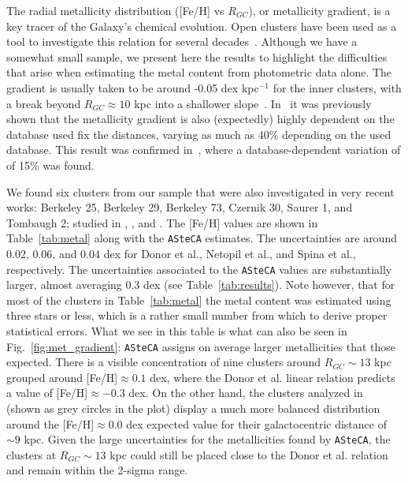 \documentclass[referee]{aa}
\begin{document}
  The radial metallicity distribution ([Fe/H] vs $R_{GC}$), or metallicity
  gradient, is a key tracer of the Galaxy's chemical evolution. Open clusters
  have been used as a tool to investigate this relation for several
  decades~\citep{Janes_1979}.
  Although we have a somewhat small sample, we present here the results to
  highlight the difficulties that arise when estimating the metal content from
  photometric data alone.
  The gradient is usually taken to be around -0.05 dex kpc$^{-1}$ for the inner
  clusters, with a break beyond $R_{GC}\approx10$ kpc into a shallower
  slope~\citep{Donor_2020}. In~\cite{Donor_2018} it was previously shown that
  the metallicity gradient is also (expectedly) highly dependent on the database
  used fix the distances, varying as much as 40\% depending on the used
  database. This result was confirmed in~\cite{Donor_2020}, where a
  database-dependent variation of of 15\% was found.

  We found six clusters from our sample that were also investigated in very
  recent works: Berkeley 25, Berkeley 29, Berkeley 73, Czernik 30, Saurer 1, and
  Tombaugh 2; studied in \cite{Donor_2020}, \cite{Netopil_2021}, and
  \cite{Spina_2021}. The [Fe/H] values are shown in Table~\ref{tab:metal} along
  with the \texttt{ASteCA} estimates. The uncertainties are around 0.02, 0.06,
  and 0.04 dex for Donor et al., Netopil et al., and Spina et al., respectively.
  The uncertainties associated to the \texttt{ASteCA} values are substantially
  larger, almost averaging 0.3 dex (see Table~\ref{tab:results}). Note however,
  that for most of the clusters in Table~\ref{tab:metal} the metal content was
  estimated using three stars or less, which is a rather small number from which
  to derive proper statistical errors. What we see in this table is what can
  also be seen in Fig.~\ref{fig:met_gradient}: \texttt{ASteCA} assigns on
  average larger metallicities that those expected.
  There is a visible concentration
  of nine clusters around $R_{GC}\sim13$ kpc grouped around
  [Fe/H]$\approx0.1$ dex, where the Donor et al. linear relation
  predicts a value of [Fe/H]$\approx-0.3$ dex. On the other hand, the clusters
  analyzed in~\cite{Perren_2020} (shown as grey circles in the plot) display a
  much more balanced distribution around the [Fe/H]$\approx0.0$ dex expected
  value for their galactocentric distance of $\sim9$ kpc.
  Given the large uncertainties for the metallicities found by \texttt{ASteCA},
  the clusters at $R_{GC}\sim13$ kpc could still be placed close to the Donor et
  al. relation and remain within the 2-sigma range.\\
\end{document}
